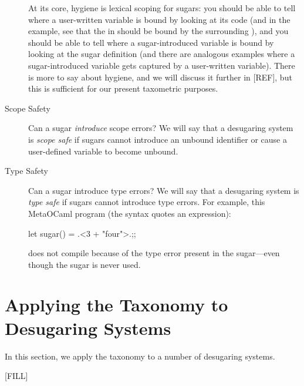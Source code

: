 \begin{description}
    At its core, hygiene is lexical scoping for sugars: you should be
    able to tell where a user-written variable is bound by looking at
    its code (and in the example, see that the  in  should be bound by the surrounding ), and
    you should be able to tell where a sugar-introduced variable is
    bound by looking at the sugar definition (and there are analogous
    examples where a sugar-introduced variable gets captured by a
    user-written variable). There is more to say about hygiene, and we
    will discuss it further in [REF], but this is sufficient for our
    present taxometric purposes. %
    
  \item[Scope Safety] Can a sugar \emph{introduce} scope errors?  We
    will say that a desugaring system is \emph{scope safe} if sugars
    cannot introduce an unbound identifier or cause a user-defined
    variable to become unbound.

  \item[Type Safety] Can a sugar introduce type errors? We will say
    that a desugaring system is \emph{type safe} if sugars cannot
    introduce type errors. For example, this MetaOCaml program (the
     syntax quotes an expression):
\begin{CorrectlyIndentedCodes}
let sugar() = .<3 + "four">.;;
\end{CorrectlyIndentedCodes}
    does not compile because of the type error present in the
    sugar---even though the sugar is never used.
\end{description}

\section{Applying the Taxonomy to Desugaring Systems}

In this section, we apply the taxonomy to a number of desugaring systems.

[FILL]

